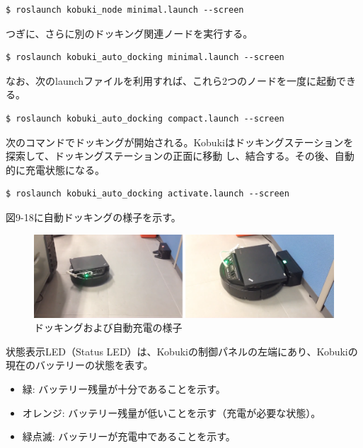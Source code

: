 \begin{itemize}
\begin{lstlisting}[language=ROS]
$ roslaunch kobuki_node minimal.launch --screen
\end{lstlisting}

つぎに、さらに別のドッキング関連ノードを実行する。

\begin{lstlisting}[language=ROS]
$ roslaunch kobuki_auto_docking minimal.launch --screen
\end{lstlisting}

なお、次のlaunchファイルを利用すれば、これら2つのノードを一度に起動できる。

\begin{lstlisting}[language=ROS]
$ roslaunch kobuki_auto_docking compact.launch --screen
\end{lstlisting}

次のコマンドでドッキングが開始される。Kobukiはドッキングステーションを探索して、ドッキングステーションの正面に移動  し、結合する。その後、自動的に充電状態になる。

\begin{lstlisting}[language=ROS]
$ roslaunch kobuki_auto_docking activate.launch --screen
\end{lstlisting}

図9-18に自動ドッキングの様子を示す。

\begin{figure}[htp]
  \centering
  \includegraphics[width=\columnwidth]{pictures/chapter9/pic_09_18.png}
  \caption{ドッキングおよび自動充電の様子}
\end{figure}

\begin{exercise}[Kobukiとドッキングステーションの状態表示LED]

  状態表示LED（Status LED）は、Kobukiの制御パネルの左端にあり、Kobukiの現在のバッテリーの状態を表す。

  \begin{itemize}
  \item 緑: バッテリー残量が十分であることを示す。
  \item オレンジ: バッテリー残量が低いことを示す（充電が必要な状態）。
  \item 緑点滅: バッテリーが充電中であることを示す。
  \end{itemize}


\end{exercise}
\end{itemize}
